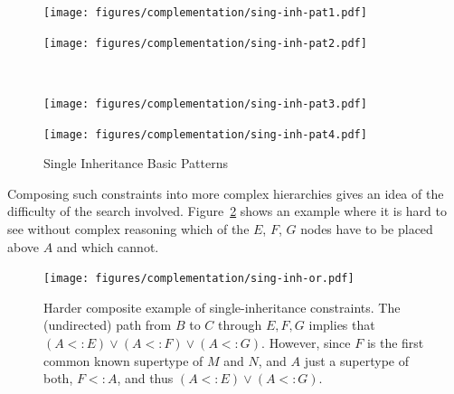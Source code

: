 \begin{figure}[htb]
  \vspace{-5mm}
  \begin{minipage}[t]{0.5\linewidth}
    \centering
    \texttt{[image: figures/complementation/sing-inh-pat1.pdf]}
    \label{hiercomp/fig:single1}
  \end{minipage}
  \hspace{0.4in}
  \begin{minipage}[t]{0.5\linewidth}
    \centering
    \texttt{[image: figures/complementation/sing-inh-pat2.pdf]}
    \label{hiercomp/fig:single2}
  \end{minipage}
  \\
  \begin{minipage}[t]{0.5\linewidth}
    \centering
    \texttt{[image: figures/complementation/sing-inh-pat3.pdf]}
    \label{hiercomp/fig:single3}
  \end{minipage}
  \hspace{0.2in}
  \begin{minipage}[t]{0.5\linewidth}
    \centering
    \texttt{[image: figures/complementation/sing-inh-pat4.pdf]}
    \label{hiercomp/fig:single4}
  \end{minipage}
  \caption{Single Inheritance Basic Patterns}
\end{figure}

Composing such constraints into more complex hierarchies gives an idea
of the difficulty of the search involved. Figure~\ref{hiercomp/fig:hard:or}
shows an example where it is hard to see without complex
reasoning which of the $E$, $F$, $G$ nodes have to be placed
above $A$ and which cannot.

\begin{figure}
  \centering
  \texttt{[image: figures/complementation/sing-inh-or.pdf]}
  \caption[Harder composite example of single-inheritance
  constraints]{ Harder composite example of single-inheritance
    constraints.  The (undirected) path from $B$ to $C$ through
    $E,F,G$ implies that $(A <: E) \lor (A <: F) \lor (A <:
    G)$. However, since $F$ is the first common known supertype of $M$
    and $N$, and $A$ just a supertype of both, $F <: A$, and thus
    $(A <: E) \lor (A <: G)$. }
\label{hiercomp/fig:hard:or}
\end{figure}

